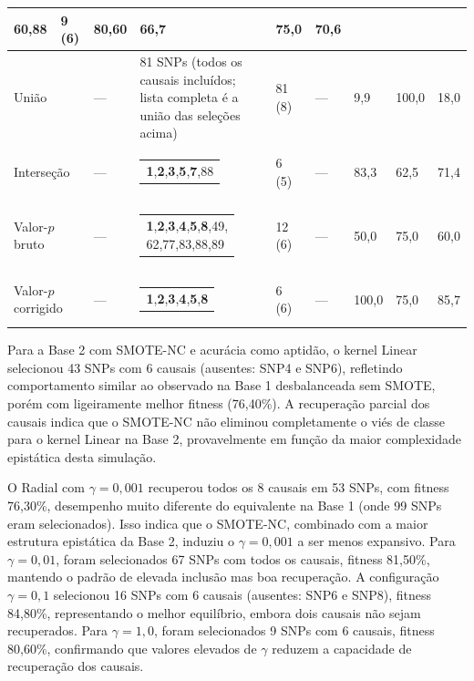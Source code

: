 \documentclass[12pt,a4paper]{article}
\makeatletter
\newcommand{\makecell}[2][t]{\begin{tabular}[#1]{@{}l@{}}#2\end{tabular}}
\newcommand{\novo}[1]{\textcolor{corNova}{#1}}
\makeatother
\begin{document}
\begin{longtable}{L{1.3cm}|L{1.3cm}|C{0.8cm}|L{4.8cm}|C{1.55cm}|C{0.95cm}|C{0.95cm}|C{0.9cm}|C{1.05cm}}
{{               60,88}} &
  \novo{9 (6)} & \novo{80,60} & \novo{66,7} & \novo{75,0} & \novo{70,6} \\
\hline
\multicolumn{2}{l|}{\novo{União}} & \novo{---} &
  \novo{81 SNPs (todos os causais incluídos; lista completa é a união das seleções acima)} &
  \novo{81 (8)} & \novo{---} & \novo{9,9} & \novo{100,0} & \novo{18,0} \\
\hline
\multicolumn{2}{l|}{\novo{Interseção}} & \novo{---} &
  \novo{\makecell[l]{\textbf{1},\textbf{2},\textbf{3},\textbf{5},\textbf{7},88}} &
  \novo{6 (5)} & \novo{---} & \novo{83,3} & \novo{62,5} & \novo{71,4} \\
\hline
\multicolumn{2}{l|}{\novo{Valor-$p$ bruto}} & \novo{---} &
  \novo{\makecell[l]{\textbf{1},\textbf{2},\textbf{3},\textbf{4},\textbf{5},\textbf{8},49,\\
               62,77,83,88,89}} &
  \novo{12 (6)} & \novo{---} & \novo{50,0} & \novo{75,0} & \novo{60,0} \\
\hline
\multicolumn{2}{l|}{\novo{Valor-$p$ corrigido}} & \novo{---} &
  \novo{\makecell[l]{\textbf{1},\textbf{2},\textbf{3},\textbf{4},\textbf{5},\textbf{8}}} &
  \novo{6 (6)} & \novo{---} & \novo{100,0} & \novo{75,0} & \novo{85,7} \\
\hline
\end{longtable}



\novo{Para a Base 2 com SMOTE-NC e acurácia como aptidão, o kernel Linear selecionou 43 SNPs com 6 causais (ausentes: SNP4 e SNP6), refletindo comportamento similar ao observado na Base 1 desbalanceada sem SMOTE, porém com ligeiramente melhor fitness (76,40\%). A recuperação parcial dos causais indica que o SMOTE-NC não eliminou completamente o viés de classe para o kernel Linear na Base 2, provavelmente em função da maior complexidade epistática desta simulação.}

\novo{O Radial com $\gamma = 0{,}001$ recuperou todos os 8 causais em 53 SNPs, com fitness 76,30\%, desempenho muito diferente do equivalente na Base 1 (onde 99 SNPs eram selecionados). Isso indica que o SMOTE-NC, combinado com a maior estrutura epistática da Base 2, induziu o $\gamma = 0{,}001$ a ser menos expansivo. Para $\gamma = 0{,}01$, foram selecionados 67 SNPs com todos os causais, fitness 81,50\%, mantendo o padrão de elevada inclusão mas boa recuperação. A configuração $\gamma = 0{,}1$ selecionou 16 SNPs com 6 causais (ausentes: SNP6 e SNP8), fitness 84,80\%, representando o melhor equilíbrio, embora dois causais não sejam recuperados. Para $\gamma = 1{,}0$, foram selecionados 9 SNPs com 6 causais, fitness 80,60\%, confirmando que valores elevados de $\gamma$ reduzem a capacidade de recuperação dos causais.}
\end{document}
